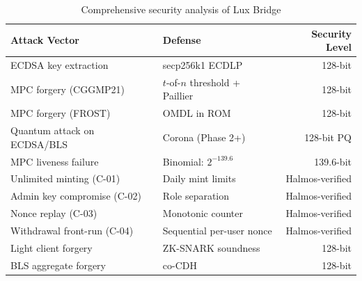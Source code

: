 \begin{table}[h]
\centering
\begin{tabular}{llr}
\toprule
\textbf{Attack Vector} & \textbf{Defense} & \textbf{Security Level} \\
\midrule
ECDSA key extraction & secp256k1 ECDLP & 128-bit \\
MPC forgery (CGGMP21) & $t$-of-$n$ threshold + Paillier & 128-bit \\
MPC forgery (FROST) & OMDL in ROM & 128-bit \\
Quantum attack on ECDSA/BLS & Corona (Phase 2+) & 128-bit PQ \\
MPC liveness failure & Binomial: $2^{-139.6}$ & 139.6-bit \\
Unlimited minting (C-01) & Daily mint limits & Halmos-verified \\
Admin key compromise (C-02) & Role separation & Halmos-verified \\
Nonce replay (C-03) & Monotonic counter & Halmos-verified \\
Withdrawal front-run (C-04) & Sequential per-user nonce & Halmos-verified \\
Light client forgery & ZK-SNARK soundness & 128-bit \\
BLS aggregate forgery & co-CDH & 128-bit \\
\bottomrule
\end{tabular}
\caption{Comprehensive security analysis of Lux Bridge}
\end{table}

